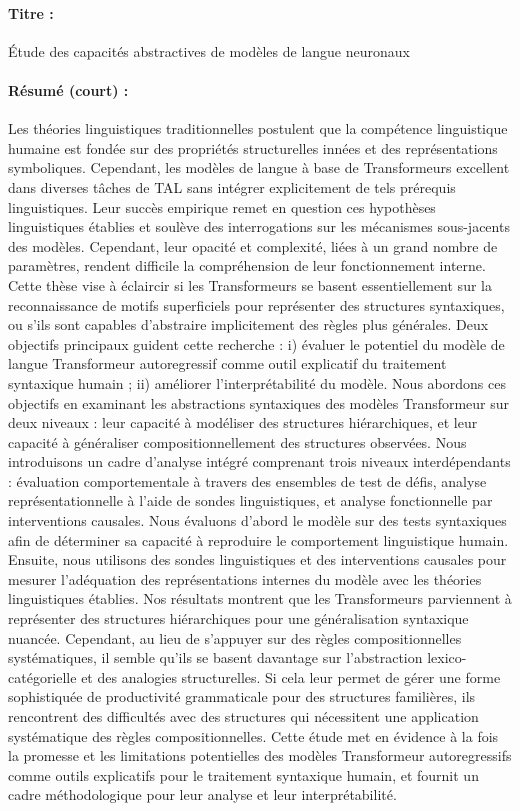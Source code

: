 
\paragraph{Titre :} Étude des capacités abstractives de modèles de langue neuronaux

\paragraph{Résumé (court) :} Les théories linguistiques traditionnelles postulent que la compétence linguistique humaine est fondée sur des propriétés structurelles innées et des représentations symboliques. Cependant, les modèles de langue à base de Transformeurs excellent dans diverses tâches de \ac{TAL} sans intégrer explicitement de tels prérequis linguistiques. Leur succès empirique remet en question ces hypothèses linguistiques établies et soulève des interrogations sur les mécanismes sous-jacents des modèles. Cependant, leur opacité et complexité, liées à un grand nombre de paramètres, rendent difficile la compréhension de leur fonctionnement interne. Cette thèse vise à éclaircir si les Transformeurs se basent essentiellement sur la reconnaissance de motifs superficiels pour représenter des structures syntaxiques, ou s'ils sont capables d’abstraire implicitement des règles plus générales. Deux objectifs principaux guident cette recherche : i) évaluer le potentiel du modèle de langue Transformeur autoregressif comme outil explicatif du traitement syntaxique humain ; ii) améliorer l’interprétabilité du modèle. Nous abordons ces objectifs en examinant les abstractions syntaxiques des modèles Transformeur sur deux niveaux : leur capacité à modéliser des structures hiérarchiques, et leur capacité à généraliser compositionnellement des structures observées. Nous introduisons un cadre d'analyse intégré comprenant trois niveaux interdépendants : évaluation comportementale à travers des ensembles de test de défis, analyse représentationnelle à l'aide de sondes linguistiques, et analyse fonctionnelle par interventions causales. Nous évaluons d'abord le modèle sur des tests syntaxiques afin de déterminer sa capacité à reproduire le comportement linguistique humain.  Ensuite, nous utilisons des sondes linguistiques et des interventions causales pour mesurer l'adéquation des représentations internes du modèle avec les théories linguistiques établies. Nos résultats montrent que les Transformeurs parviennent à représenter des structures hiérarchiques pour une généralisation syntaxique nuancée. Cependant, au lieu de s'appuyer sur des règles compositionnelles systématiques, il semble qu'ils se basent davantage sur l'abstraction lexico-catégorielle et des analogies structurelles. Si cela leur permet de gérer une forme sophistiquée de productivité grammaticale pour des structures familières, ils rencontrent des difficultés avec des structures qui nécessitent une application systématique des règles compositionnelles. Cette étude met en évidence à la fois la promesse et les limitations potentielles des modèles Transformeur autoregressifs comme outils explicatifs pour le traitement syntaxique humain, et fournit un cadre méthodologique pour leur analyse et leur interprétabilité.


